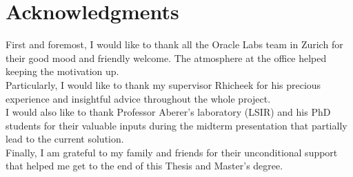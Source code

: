 \chapter{Acknowledgments}
First and foremost, I would like to thank all the Oracle Labs team in Zurich for their good mood and friendly welcome. The atmosphere at the office helped keeping the motivation up. \\
Particularly, I would like to thank my supervisor Rhicheek for his precious experience and insightful advice throughout the whole project. \\
I would also like to thank Professor Aberer's laboratory (LSIR) and his PhD students for their valuable inputs during the midterm presentation that partially lead to the current solution. \\
Finally, I am grateful to my family and friends for their unconditional support that helped me get to the end of this Thesis and Master's degree.